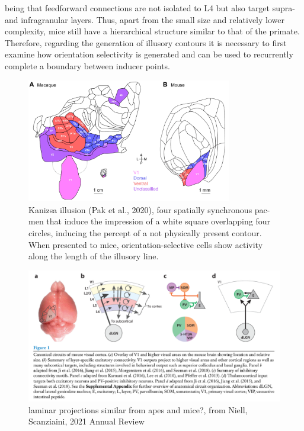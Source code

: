 \documentclass[12pt]{article}
\begin{document}
being that feedforward connections are not isolated to L4 but also target supra- and infragranular layers. Thus, apart from the small size and relatively lower complexity, mice still have a hierarchical structure similar to that of the primate. Therefore, regarding the generation of illusory contours it is necessary to first examine how orientation selectivity is generated and can be used to recurrently complete a boundary between inducer points.

\begin{figure}[H]
  \centering
  \includegraphics[width=0.8\textwidth]{figures/compared_cortex.png}
  \caption{Kanizsa illusion (Pak et al., 2020), four spatially synchronous pac-men that induce the impression of a white square overlapping four circles, inducing the percept of a not physically present contour. When presented to mice, orientation-selective cells show activity along the length of the illusory line.}
  \label{fig:simple_abutting}
\end{figure}

\begin{figure}[H]
  \centering
  \includegraphics[width=0.8 \textwidth]{figures/Canonical_laminar_projection.png}
  \caption{laminar projections similar from apes and mice?, from Niell, Scanziaini, 2021 Annual Review}
  \label{fig:figure 3}
\end{figure}
\end{document}
